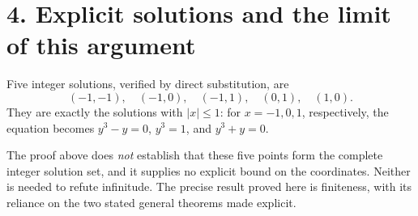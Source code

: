\documentclass[11pt,a4paper]{article}
\begin{document}
\section*{4. Explicit solutions and the limit of this argument}

Five integer solutions, verified by direct substitution, are
\[
 \boxed{(-1,-1),\quad(-1,0),\quad(-1,1),\quad(0,1),\quad(1,0).}
\]
They are exactly the solutions with $|x|\le1$: for $x=-1,0,1$, respectively,
the equation becomes $y^3-y=0$, $y^3=1$, and $y^3+y=0$.

The proof above does \emph{not} establish that these five points form the
complete integer solution set, and it supplies no explicit bound on the
coordinates. Neither is needed to refute infinitude. The precise result
proved here is finiteness, with its reliance on the two stated general
theorems made explicit.
\end{document}
